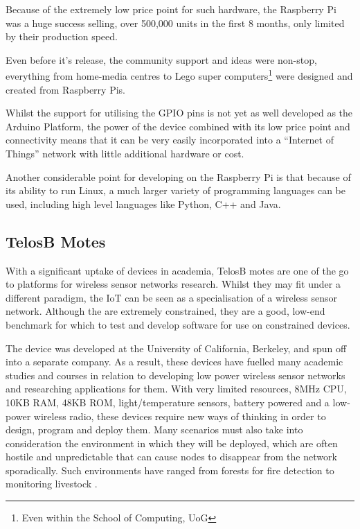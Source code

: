 Because of the extremely low price point for such hardware, the Raspberry Pi was a huge success selling, over 500,000 units in the first 8 months, only limited by their production speed.\cite{RaspberryPiSold}

Even before it's release, the community support and ideas were non-stop, everything from home-media centres\cite{Raspbmc} to Lego super computers\footnote{Even within the School of Computing, UoG}\cite{LegoSuperComputer} were designed and created from Raspberry Pis.

Whilst the support for utilising the GPIO pins is not yet as well developed as the Arduino Platform, the power of the device combined with its low price point and connectivity means that it can be very easily incorporated into a ``Internet of Things'' network with little additional hardware or cost.

Another considerable point for developing on the Raspberry Pi is that because of its ability to run Linux, a much larger variety of programming languages can be used, including high level languages like Python, C++ and Java.

\subsection{TelosB Motes} %
\label{sub:telos_b_motes}

With a significant uptake of devices in academia, TelosB motes are one of the go to platforms for wireless sensor networks research. Whilst they may fit under a different paradigm, the IoT can be seen as a specialisation of a wireless sensor network. Although the are extremely constrained, they are a good, low-end benchmark for which to test and develop software for use on constrained devices. 

The device was developed at the University of California, Berkeley, and spun off into a separate company. As a result, these devices have fuelled many academic studies and courses in relation to developing low power wireless sensor networks and researching applications for them. With very limited resources, 8MHz CPU, 10KB RAM, 48KB ROM, light/temperature sensors, battery powered and a low-power wireless radio, these devices require new ways of thinking in order to design, program and deploy them. Many scenarios must also take into consideration the environment in which they will be deployed, which are often hostile and unpredictable that can cause nodes to disappear from the network sporadically. Such environments have ranged from forests for fire detection\cite{FireDetection} to monitoring livestock \cite{Livestock}.

